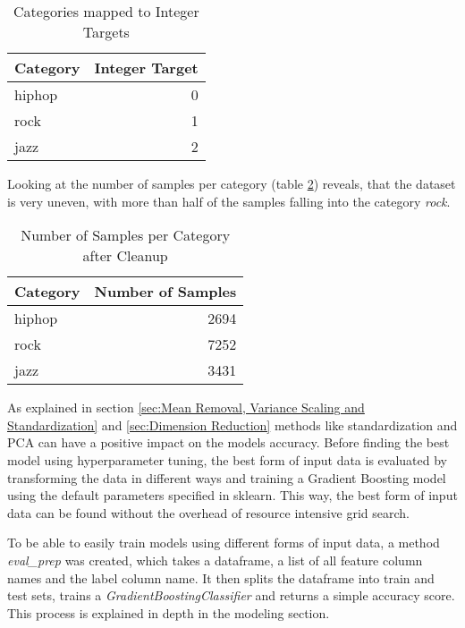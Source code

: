 
\begin{table}[H]
    \centering
    \caption{Categories mapped to Integer Targets}
    \label{tbl:Categories mapped to Integer Targets}
    \begin{tabular}{lr} 
        \toprule
        Category & Integer Target \\ [0.5ex]
        \midrule
        hiphop & 0 \\ [1ex]
        rock & 1 \\ [1ex]
        jazz & 2 \\ [1ex]
        \bottomrule
    \end{tabular}
\end{table}

Looking at the number of samples per category (table \ref{tbl:Number of Samples per Category after Cleanup}) reveals, that the dataset
is very uneven, with more than half of the samples falling into the category \emph{rock}.

\begin{table}[H]
    \centering
    \caption{Number of Samples per Category after Cleanup}
    \label{tbl:Number of Samples per Category after Cleanup}
    \begin{tabular}{lr} 
        \toprule
        Category & Number of Samples \\ [0.5ex]
        \midrule
        hiphop & 2694 \\ [1ex]
        rock & 7252 \\ [1ex]
        jazz & 3431 \\ [1ex]
        \bottomrule
    \end{tabular}
\end{table}

As explained in section \ref{sec:Mean Removal, Variance Scaling and Standardization} and \ref{sec:Dimension Reduction}
methods like standardization and \ac{PCA} can have a positive impact on the models accuracy.
Before finding the best model using hyperparameter tuning, the best form of input data is evaluated by transforming
the data in different ways and training a Gradient Boosting model using the default parameters specified in sklearn.
This way, the best form of input data can be found without the overhead of resource intensive grid search.

To be able to easily train models using different forms of input data, a method \emph{eval\_prep} was created,
which takes a dataframe, a list of all feature column names and the label column name. It then splits the dataframe
into train and test sets, trains a \emph{GradientBoostingClassifier} and returns a simple accuracy score.
This process is explained in depth in the modeling section.

